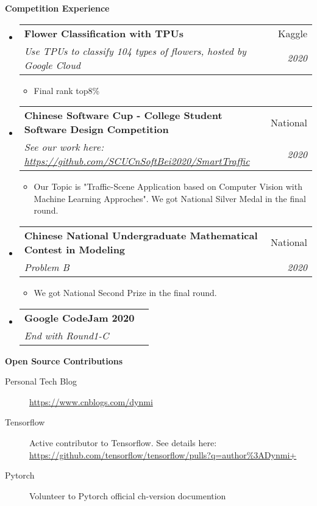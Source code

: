 \documentclass[letterpaper,11pt]{article}
\makeatletter
\newcommand{\resitem}[1]{\item #1 \vspace{-2pt}}
\newcommand{\resheading}[1]{{\large \colorbox{mygrey}{\begin{minipage}{\textwidth}{\textbf{#1 \vphantom{p\^{E}}}}\end{minipage}}}}
\newcommand{\ressubheading}[4]{
\begin{tabular*}{7.0in}{l@{\extracolsep{\fill}}r}
		\textbf{#1} & #2 \\
		\textit{#3} & \textit{#4} \\
\end{tabular*}\vspace{-6pt}}
\makeatother
\begin{document}
\resheading{Competition Experience}
\begin{itemize}
\item
	\ressubheading{Flower Classification with TPUs}{Kaggle}{Use TPUs to classify 104 types of flowers, hosted by Google Cloud}{2020}
	\begin{itemize}
		\resitem{Final rank top8\%}
	\end{itemize}
\item
	\ressubheading{Chinese Software Cup - College Student Software Design Competition }{National}{See our work here: \href{https://github.com/SCUCnSoftBei2020/SmartTraffic}{https://github.com/SCUCnSoftBei2020/SmartTraffic}}{2020}
	\begin{itemize}
		\resitem{Our Topic is "Traffic-Scene Application based on Computer Vision with Machine Learning Approches". We got National Silver Medal in the final round.}
	\end{itemize}
\item
	\ressubheading{Chinese National Undergraduate Mathematical Contest in Modeling}{National}{Problem B}{2020}
	\begin{itemize}
		\resitem{We got National Second Prize in the final round.}
	\end{itemize}
\item
	\ressubheading{Google CodeJam 2020}{}{End with Round1-C }{}
\end{itemize}


\resheading{Open Source Contributions}

\begin{description}
\item[Personal Tech Blog] \href{https://www.cnblogs.com/dynmi}{https://www.cnblogs.com/dynmi}
\item[Tensorflow] Active contributor to Tensorflow. See details here: \href{https://github.com/tensorflow/tensorflow/pulls?q=author\%3ADynmi+ }{https://github.com/tensorflow/tensorflow/pulls?q=author\%3ADynmi+ } 
\item[Pytorch] Volunteer to Pytorch official ch-version documention 
\end{description}
\end{document}
